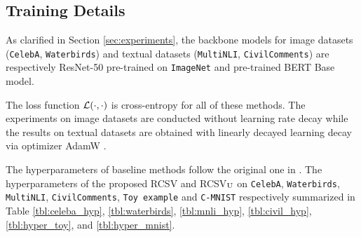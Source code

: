 \subsection{Training Details}\label{app:hyperparemeters}
As clarified in Section \ref{sec:experiments}, the backbone models for image datasets (\texttt{CelebA}, \texttt{Waterbirds}) and textual datasets (\texttt{MultiNLI}, \texttt{CivilComments}) are respectively ResNet-50 \citep{he2016deep} pre-trained on \texttt{ImageNet} \citep{deng2009imagenet} and pre-trained BERT Base model\citep{devlin2019bert}. 
\par
The loss function $\mathcal{L}(\cdot, \cdot)$ is cross-entropy for all of these methods. The experiments on image datasets are conducted without learning rate decay while the results on textual datasets are obtained with linearly decayed learning decay via optimizer AdamW \citep{loshchilov2018decoupled}.
\par
The hyperparameters of baseline methods follow the original one in \citep{gulrajani2020search,sagawa2019distributionally,arpit2019predicting,arjovsky2019invariant,idrissi2021simple}. The hyperparameters of the proposed RCSV and RCSV$_{\rm U}$ on \texttt{CelebA}, \texttt{Waterbirds}, \texttt{MultiNLI}, \texttt{CivilComments}, \texttt{Toy example} and \texttt{C-MNIST} respectively summarized in Table \ref{tbl:celeba_hyp}, \ref{tbl:waterbirds}, \ref{tbl:mnli_hyp}, \ref{tbl:civil_hyp}, \ref{tbl:hyper_toy}, and \ref{tbl:hyper_mnist}.
